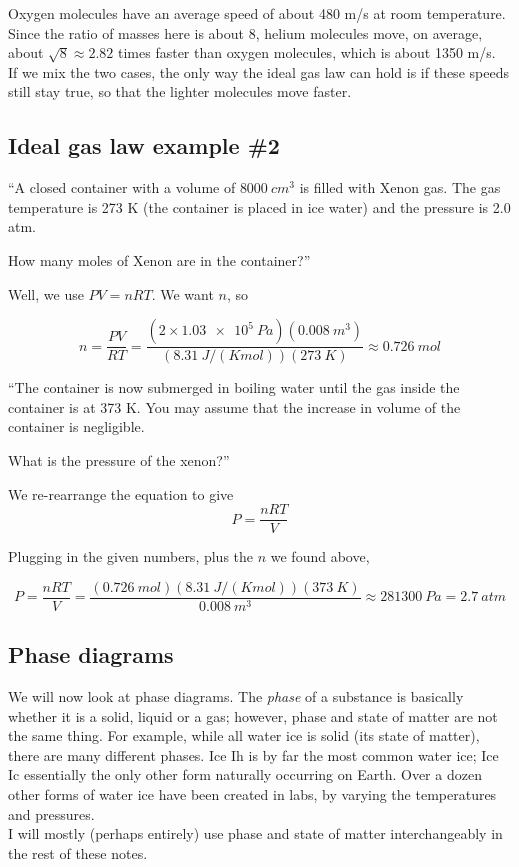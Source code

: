 \documentclass[8.01x]{subfiles}
\begin{document}
Oxygen molecules have an average speed of about 480 m/s at room temperature. Since the ratio of masses here is about 8, helium molecules move, on average, about $\sqrt{8} \approx 2.82$ times faster than oxygen molecules, which is about 1350 m/s.\\
If we mix the two cases, the only way the ideal gas law can hold is if these speeds still stay true, so that the lighter molecules move faster.

\subsection{Ideal gas law example \#2}

``A closed container with a volume of $\SI{8000}{cm^3}$ is filled with Xenon gas. The gas temperature is 273 K (the container is placed in ice water) and the pressure is 2.0 atm.

How many moles of Xenon are in the container?''

Well, we use $P V = n R T$. We want $n$, so

\begin{equation}
n = \frac{PV}{RT} = \frac{(2\times\SI{1.03e5}{Pa})(\SI{0.008}{m^3})}{(\SI{8.31}{J/(K mol)})(\SI{273}{K})} \approx \SI{0.726}{mol}
\end{equation}

``The container is now submerged in boiling water until the gas inside the container is at 373 K. You may assume that the increase in volume of the container is negligible.

What is the pressure of the xenon?''

We re-rearrange the equation to give
\begin{equation}
P = \frac{n R T}{V}
\end{equation}

Plugging in the given numbers, plus the $n$ we found above,

\begin{equation}
P = \frac{n R T}{V} = \frac{ (\SI{0.726}{mol})(\SI{8.31}{J/(K mol)})(\SI{373}{K})}{\SI{0.008}{m^3}} \approx \SI{281300}{Pa} = \SI{2.7}{atm}
\end{equation}

\subsection{Phase diagrams}

We will now look at phase diagrams. The \emph{phase} of a substance is basically whether it is a solid, liquid or a gas; however, phase and state of matter are not the same thing. For example, while all water ice is solid (its state of matter), there are many different phases. Ice Ih is by far the most common water ice; Ice Ic essentially the only other form naturally occurring on Earth. Over a dozen other forms of water ice have been created in labs, by varying the temperatures and pressures.\\
I will mostly (perhaps entirely) use phase and state of matter interchangeably in the rest of these notes.
\end{document}
